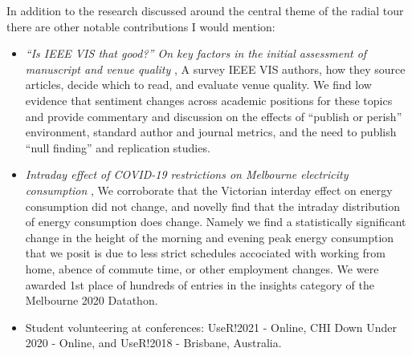 \documentclass{template/monashthesis}
\begin{document}
In addition to the research discussed around the central theme of the radial tour there are other notable contributions I would mention:

\begin{itemize}
\tightlist
\item
  \emph{``Is IEEE VIS that good?'' On key factors in the initial assessment of manuscript and venue quality} \autocite{spyrison_is_2021}, A survey IEEE VIS authors, how they source articles, decide which to read, and evaluate venue quality. We find low evidence that sentiment changes across academic positions for these topics and provide commentary and discussion on the effects of ``publish or perish'' environment, standard author and journal metrics, and the need to publish ``null finding'' and replication studies.
\item
  \emph{Intraday effect of COVID-19 restrictions on Melbourne electricity consumption} \autocite{barrow_changes_2020}, We corroborate that the Victorian interday effect on energy consumption did not change, and novelly find that the intraday distribution of energy consumption does change. Namely we find a statistically significant change in the height of the morning and evening peak energy consumption that we posit is due to less strict schedules accociated with working from home, abence of commute time, or other employment changes. We were awarded 1st place of hundreds of entries in the insights category of the Melbourne 2020 Datathon.
\item
  Student volunteering at conferences: UseR!2021 - Online, CHI Down Under 2020 - Online, and UseR!2018 - Brisbane, Australia.
\end{itemize}

\printbibliography[heading=bibintoc]
\end{document}
